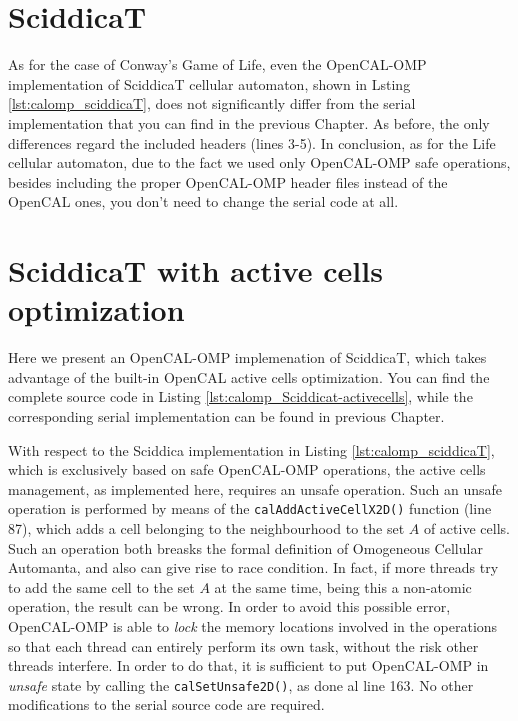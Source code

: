 \section{SciddicaT}

As for the case of Conway's Game of Life, even the OpenCAL-OMP
implementation of SciddicaT cellular automaton, shown in Lsting
\ref{lst:calomp_sciddicaT}, does not significantly differ from the
serial implementation that you can find in the previous Chapter. As
before, the only differences regard the included headers (lines
3-5). In conclusion, as for the Life cellular automaton, due to the
fact we used only OpenCAL-OMP safe operations, besides including the
proper OpenCAL-OMP header files instead of the OpenCAL ones, you don't
need to change the serial code at all.



\section{SciddicaT with active cells optimization}
Here we present an OpenCAL-OMP implemenation of SciddicaT, which takes
advantage of the built-in OpenCAL active cells optimization. You can
find the complete source code in Listing
\ref{lst:calomp_Sciddicat-activecells}, while the corresponding serial
implementation can be found in previous Chapter.



With respect to the Sciddica implementation in Listing
\ref{lst:calomp_sciddicaT}, which is exclusively based on safe
OpenCAL-OMP operations, the active cells management, as implemented
here, requires an unsafe operation. Such an unsafe operation is
performed by means of the \verb'calAddActiveCellX2D()' function (line
87), which adds a cell belonging to the neighbourhood to the set $A$
of active cells. Such an operation both breasks the formal definition
of Omogeneous Cellular Automanta, and also can give rise to race
condition. In fact, if more threads try to add the same cell to the
set $A$ at the same time, being this a non-atomic operation, the
result can be wrong. In order to avoid this possible error,
OpenCAL-OMP is able to \emph{lock} the memory locations involved in
the operations so that each thread can entirely perform its own task,
without the risk other threads interfere. In order to do that, it is
sufficient to put OpenCAL-OMP in \emph{unsafe} state by calling the
\verb'calSetUnsafe2D()', as done al line 163. No other modifications
to the serial source code are required.

